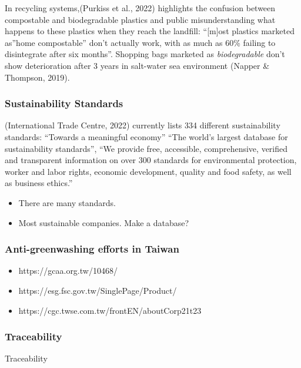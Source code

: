 \documentclass[
  letterpaper,
  DIV=11,
  numbers=noendperiod]{scrartcl}
\providecommand{\tightlist}{%
  \setlength{\itemsep}{0pt}\setlength{\parskip}{0pt}}\usepackage{longtable,booktabs,array}
\begin{document}
In recycling systems,(Purkiss et al., 2022) highlights the confusion
between compostable and biodegradable plastics and public
misunderstanding what happens to these plastics when they reach the
landfill: ``{[}m{]}ost plastics marketed as''home compostable'' don't
actually work, with as much as 60\% failing to disintegrate after six
months''. Shopping bags marketed as \emph{biodegradable} don't show
deterioration after 3 years in salt-water sea environment (Napper \&
Thompson, 2019).

\subsubsection{Sustainability Standards}\label{sustainability-standards}

(International Trade Centre, 2022) currently lists 334 different
sustainability standards: ``Towards a meaningful economy'' ``The world's
largest database for sustainability standards'', ``We provide free,
accessible, comprehensive, verified and transparent information on over
300 standards for environmental protection, worker and labor rights,
economic development, quality and food safety, as well as business
ethics.''

\begin{itemize}
\item
  There are many standards.
\item
  Most sustainable companies. Make a database?
\end{itemize}

\subsubsection{Anti-greenwashing efforts in
Taiwan}\label{anti-greenwashing-efforts-in-taiwan}

\begin{itemize}
\tightlist
\item
  https://gcaa.org.tw/10468/
\item
  https://esg.fsc.gov.tw/SinglePage/Product/
\item
  https://cgc.twse.com.tw/frontEN/aboutCorp21t23
\end{itemize}

\subsubsection{Traceability}\label{traceability}

Traceability
\end{document}
